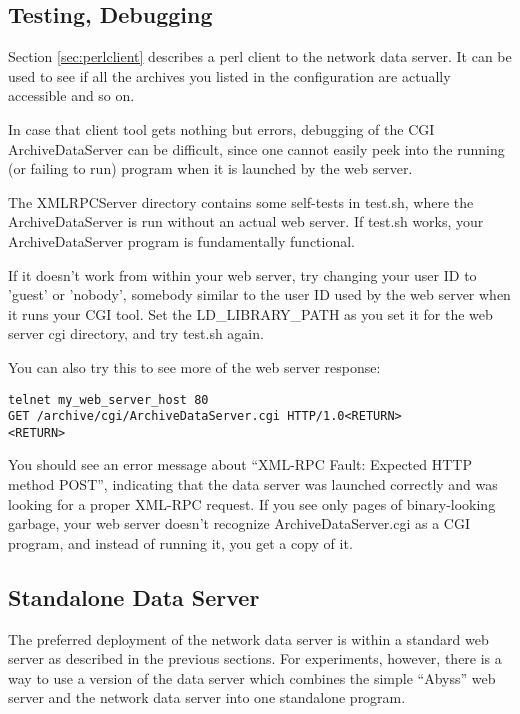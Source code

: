 


\subsection{Testing, Debugging}  %
Section \ref{sec:perlclient} describes a perl client to the network
data server. It can be used to see if all the archives you listed
in the configuration are actually accessible and so on.

In case that client tool gets nothing but errors, debugging of the
CGI ArchiveDataServer can be difficult, since one cannot easily
peek into the running (or failing to run) program when it is
launched by the web server.

The XMLRPCServer directory contains some self-tests in test.sh,
where the ArchiveDataServer is run without an actual web server.
If test.sh works, your ArchiveDataServer program is fundamentally
functional.

If it doesn't work from within your web server, try changing
your user ID to 'guest' or 'nobody', somebody similar to the user ID
used by the web server when it runs your CGI tool. Set the
LD\_LIBRARY\_PATH as you set it for the web server cgi directory,
and try test.sh again.

\noindent You can also try this to see more of the web server response:

\begin{lstlisting}[keywordstyle=\sffamily]
telnet my_web_server_host 80
GET /archive/cgi/ArchiveDataServer.cgi HTTP/1.0<RETURN>
<RETURN>
\end{lstlisting}

\noindent You should see an error message about ``XML-RPC Fault: Expected HTTP method POST'',
indicating that the data server was launched correctly and
was looking for a proper XML-RPC request.
If you see only pages of binary-looking garbage, your web server
doesn't recognize ArchiveDataServer.cgi as a CGI program,
and instead of running it, you get a copy of it.

\subsection{Standalone Data Server} %
The preferred deployment of the network data server is within a
standard web server as described in the previous sections.
For experiments, however, there is a way to use a version of the 
data server which combines the simple ``Abyss''
web server and the network data server into one standalone program.

